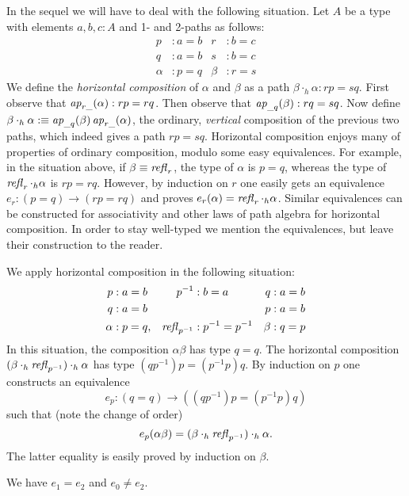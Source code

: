 \documentclass[english,a4]{article}
\begin{document}
In the sequel we will have to deal with the following situation.
Let $A$ be a type with elements $a, b, c : A$ and 1- and 2-paths as follows:
%
\begin{align*}
  p &: a = b       &       r &: b = c \\
  q &: a = b       &       s &: b = c \\
  \alpha &: p = q  &   \beta &: r = s
\end{align*}
%
We define the \emph{horizontal composition} of $\alpha$ and $\beta$ as 
a path $\beta\cdot_h\alpha: rp=sq$.
First observe that $\mathop{{\it ap}_{r\_}}(\alpha):rp=rq$.
Then observe that $\mathop{{\it ap}_{\_q}}(\beta):rq=sq$.
Now define $\beta\cdot_h\alpha \mathrel{\hbox{:}\mkern-5mu\equiv} \mathop{{\it ap}_{\_q}}(\beta)\mathop{{\it ap}_{r\_}}(\alpha)$,
the ordinary, \emph{vertical} composition of the previous two paths,
which indeed gives a path $rp=sq$. Horizontal composition enjoys many of
properties of ordinary composition, modulo some easy equivalences.
For example, in the situation above, if $\beta\equiv\mathop{{\mathit{refl}}_{r}}$,
the type of $\alpha$ is $p=q$, whereas the type of $\mathop{{\mathit{refl}}_{r}}\cdot_h\alpha$
is $rp=rq$. However, by induction on $r$ one easily gets an equivalence
$e_r : (p=q) \to (rp=rq)$ and proves $e_r(\alpha)=\mathop{{\mathit{refl}}_{r}}\cdot_h\alpha$.
Similar equivalences can be constructed for associativity and other laws
of path algebra for horizontal composition. In order to stay well-typed
we mention the equivalences, but leave their construction to the reader.

We apply horizontal composition in the following situation:
%
\begin{align*}
  p &: a = b       &   p^{-1}       &: b=a           & q     &: a = b \\
  q &: a = b       &                &                & p     &: a = b \\
  \alpha &: p = q, &   \mathop{{\mathit{refl}}_{p^{-1}}}&: p^{-1}=p^{-1} & \beta &: q = p
\end{align*}
% 
In this situation, the composition $\alpha\beta$ has type $q=q$.
The horizontal composition $(\beta\cdot_h\mathop{{\mathit{refl}}_{p^{-1}}})\cdot_h\alpha$
has type $(qp^{-1})p = (p^{-1}p)q$. By induction on $p$ one constructs
an equivalence 
\[
e_p: (q=q)\to((qp^{-1})p = (p^{-1}p)q)
\]
such that (note the change of order) 
\[
e_p(\alpha\beta)=(\beta\cdot_h\mathop{{\mathit{refl}}_{p^{-1}}})\cdot_h\alpha.
\]
The latter equality is easily proved by induction on $\beta$.

\begin{lemma} We have $e_1 = e_2$ and $e_0 \neq e_2$.
\end{lemma}
\end{document}
